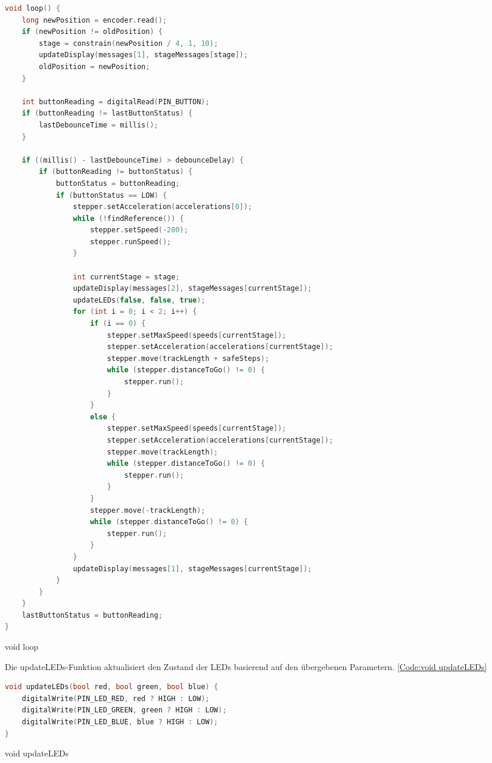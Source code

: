\begin{code}
	\begin{lstlisting}[language=c++]
void loop() {
	long newPosition = encoder.read();
	if (newPosition != oldPosition) {
		stage = constrain(newPosition / 4, 1, 10);
		updateDisplay(messages[1], stageMessages[stage]);
		oldPosition = newPosition;
	}
	
	int buttonReading = digitalRead(PIN_BUTTON);
	if (buttonReading != lastButtonStatus) {
		lastDebounceTime = millis();
	}
	
	if ((millis() - lastDebounceTime) > debounceDelay) {
		if (buttonReading != buttonStatus) {
			buttonStatus = buttonReading;
			if (buttonStatus == LOW) {
				stepper.setAcceleration(accelerations[0]);
				while (!findReference()) {
					stepper.setSpeed(-200);
					stepper.runSpeed();
				}
				
				int currentStage = stage;
				updateDisplay(messages[2], stageMessages[currentStage]);
				updateLEDs(false, false, true);
				for (int i = 0; i < 2; i++) {
					if (i == 0) {
						stepper.setMaxSpeed(speeds[currentStage]);
						stepper.setAcceleration(accelerations[currentStage]);
						stepper.move(trackLength + safeSteps);
						while (stepper.distanceToGo() != 0) {
							stepper.run();
						}
					}
					else {
						stepper.setMaxSpeed(speeds[currentStage]);
						stepper.setAcceleration(accelerations[currentStage]);
						stepper.move(trackLength);
						while (stepper.distanceToGo() != 0) {
							stepper.run();
						}
					}
					stepper.move(-trackLength);
					while (stepper.distanceToGo() != 0) {
						stepper.run();
					}
				}
				updateDisplay(messages[1], stageMessages[currentStage]);
			}
		}
	}
	lastButtonStatus = buttonReading;
}
\end{lstlisting}      

\caption[void loop]{void loop}\label{Code:void loop}    
\end{code} 

Die updateLEDs-Funktion aktualisiert den Zustand der LEDs basierend auf den übergebenen Parametern. \ref{Code:void updateLEDs}

\begin{code}
	\begin{lstlisting}[language=c++]
void updateLEDs(bool red, bool green, bool blue) {
	digitalWrite(PIN_LED_RED, red ? HIGH : LOW);
	digitalWrite(PIN_LED_GREEN, green ? HIGH : LOW);
	digitalWrite(PIN_LED_BLUE, blue ? HIGH : LOW);
}
\end{lstlisting}      

\caption[void updateLEDs]{void updateLEDs}\label{Code:void updateLEDs}    
\end{code}

